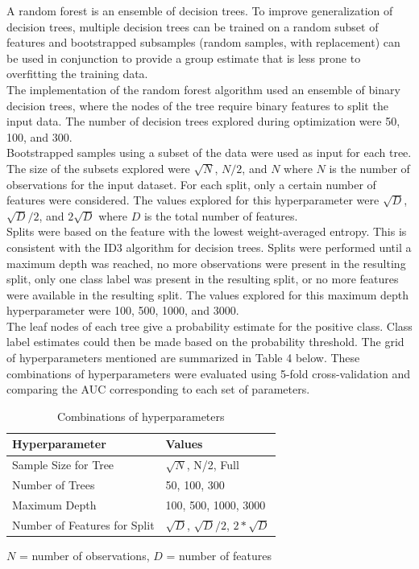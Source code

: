 \documentclass[11pt]{article}
\begin{document}
A random forest is an ensemble of decision trees. To improve generalization of decision trees, multiple decision trees can be trained on a random subset of features and bootstrapped subsamples (random samples, with replacement) can be used in conjunction to provide a group estimate that is less prone to overfitting the training data. \\
 
The implementation of the random forest algorithm used an ensemble of binary decision trees, where the nodes of the tree require binary features to split the input data. The number of decision trees explored during optimization were 50, 100, and 300. \\
 
Bootstrapped samples using a subset of the data were used as input for each tree. The size of the subsets explored were $\sqrt{N}$, $N/2$, and $N$ where $N$ is the number of observations for the input dataset. For each split, only a certain number of features were considered. The values explored for this hyperparameter were $\sqrt{D}$, $\sqrt{D}/2$, and $2\sqrt{D}$ where $D$ is the total number of features.  \\
 
Splits were based on the feature with the lowest weight-averaged entropy. This is consistent with the ID3 algorithm for decision trees. Splits were performed until a maximum depth was reached, no more observations were present in the resulting split, only one class label was present in the resulting split, or no more features were available in the resulting split. The values explored for this maximum depth hyperparameter were 100, 500, 1000, and 3000. \\
 
The leaf nodes of each tree give a probability estimate for the positive class. Class label estimates could then be made based on the probability threshold. The grid of hyperparameters mentioned are summarized in Table 4 below. These combinations of hyperparameters were evaluated using 5-fold cross-validation and comparing the AUC corresponding to each set of parameters. \\
  

\begin{table} [h]
\centering
\caption{Combinations of hyperparameters}
\begin{tabular} {ll}
\hline 
\textbf{Hyperparameter }&\textbf{Values}\\
\hline
Sample Size for Tree & $\sqrt{N}$, 
N/2, 
Full \\
Number of Trees &50, 
100, 
300 \\
Maximum Depth  &100, 
500,
1000, 
3000 \\
Number of Features for Split &$\sqrt{D}$,
$\sqrt{D}/2$, 
$2*\sqrt{D}$ \\
\hline 
\end{tabular}
\label{tA}
\end{table}
\begin{center}
    $N$ = number of observations, $D$ = number of features
\end{center}
\end{document}
